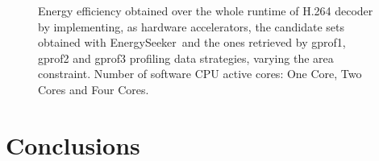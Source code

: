 \documentclass[]{usiinfthesis}
\newcommand{\eseeker}{{EnergySeeker}}
\begin{document}
\begin{figure}[t!]
\centering
{}
\caption{Energy efficiency obtained over the whole runtime of H.264 decoder by implementing, as hardware 
accelerators, the candidate sets obtained with \eseeker\ and the ones retrieved by gprof1, gprof2 and 
gprof3 profiling data strategies, varying the area constraint. Number of software CPU active cores: One Core, Two Cores and Four Cores.}
\label{fig:energy}
\end{figure}

%
%
%
%
%
%
%

\section{Conclusions}
\label{sec:conclusions_as}
\end{document}

